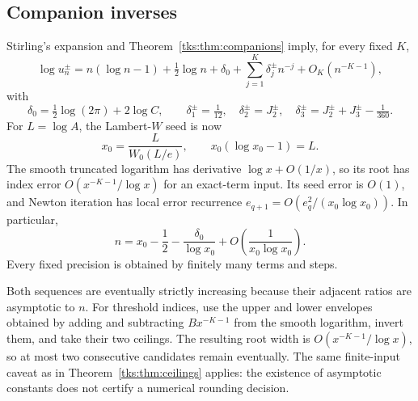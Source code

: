 \subsection{Companion inverses}
Stirling's expansion and Theorem~\ref{tks:thm:companions} imply, for every fixed $K$,
\begin{equation}\label{tks:eq:companionlog}
\log u_n^\pm=n(\log n-1)+\tfrac12\log n+\delta_0
 +\sum_{j=1}^{K}\delta_j^\pm n^{-j}+O_K(n^{-K-1}),
\end{equation}
with
\[
\delta_0=\tfrac12\log(2\pi)+2\log C,\qquad
\delta_1^\pm=\tfrac1{12},\quad
\delta_2^\pm=J_2^\pm,\quad
\delta_3^\pm=J_2^\pm+J_3^\pm-\tfrac1{360}.
\]
For $L=\log A$, the Lambert-$W$ seed is now
\begin{equation}\label{tks:eq:companionseed}
x_0=\frac{L}{W_0(L/e)},\qquad x_0(\log x_0-1)=L.
\end{equation}
The smooth truncated logarithm has derivative $\log x+O(1/x)$, so its root has index error $O(x^{-K-1}/\log x)$ for an exact-term input. Its seed error is $O(1)$, and Newton iteration has local error recurrence $e_{q+1}=O(e_q^2/(x_0\log x_0))$. In particular,
\begin{equation}\label{tks:eq:companioninverse}
n=x_0-\frac12-\frac{\delta_0}{\log x_0}
               +O\left(\frac1{x_0\log x_0}\right).
\end{equation}
Every fixed precision is obtained by finitely many terms and steps.

Both sequences are eventually strictly increasing because their adjacent ratios are asymptotic to $n$. For threshold indices, use the upper and lower envelopes obtained by adding and subtracting $Bx^{-K-1}$ from the smooth logarithm, invert them, and take their two ceilings. The resulting root width is $O(x^{-K-1}/\log x)$, so at most two consecutive candidates remain eventually. The same finite-input caveat as in Theorem~\ref{tks:thm:ceilings} applies: the existence of asymptotic constants does not certify a numerical rounding decision.
